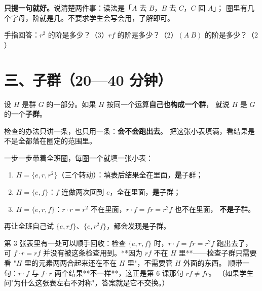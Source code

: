 \begin{zhu}
  \textbf{只提一句就好。}说清楚两件事：读法是「\(A\) 去 \(B\)，\(B\) 去 \(C\)，\(C\) 回 \(A\)」；
  圈里有几个字母，阶就是几。不要求学生会写会用，了解即可。
\end{zhu}

\begin{caozuo}
  手指回答：\(r^2\) 的阶是多少？（\(3\)）\(rf\) 的阶是多少？（\(2\)）\((A\ B)\) 的阶是多少？（\(2\)）
\end{caozuo}

\section*{三、子群（20—40 分钟）}

\begin{definition}[子群]
  设 \(H\) 是群 \(G\) 的一部分。如果 \(H\) 按同一个运算\textbf{自己也构成一个群}，
  就说 \(H\) 是 \(G\) 的一个\textbf{子群}。
\end{definition}

\begin{zhu}
  检查的办法只讲一条，也只用一条：\textbf{会不会跑出去}。
  把这张小表填满，看结果是不是全都落在圈定的范围里。
\end{zhu}

\begin{caozuo}
  一步一步带着全班圈，每圈一个就填一张小表：
  \begin{enumerate}
    \item \(H=\{e,r,r^2\}\)（三个转动）：填表后结果全在里面，\textbf{是}子群；
    \item \(H=\{e,f\}\)：\(f\) 连做两次回到 \(e\)，全在里面，\textbf{是}子群；
    \item \(H=\{e,r,f\}\)：\(r\cdot r=r^2\) 不在里面，\(r\cdot f=fr=r^2f\) 也不在里面，
      \textbf{不是}子群。
  \end{enumerate}
  再让全班自己试 \(\{e,rf\}\)、\(\{e,r^2f\}\)，都会发现是子群。
\end{caozuo}

\begin{zhu}
  第 3 张表里有一处可以顺手回收：检查 \(\{e,r,f\}\) 时，\(r\cdot f=fr=r^2f\) 跑出去了，
  可 \(f\cdot r=rf\) 并没有被这条检查用到。**因为 \(rf\) 不在 \(H\) 里**——检查子群只需要看
  "\(H\) 里的元素两两合起来还在不在 \(H\) 里"，不需要管 \(H\) 外面的东西。
  顺带一句：\(r\cdot f\) 与 \(f\cdot r\) 两个结果**不一样**，这正是第 6 课那句 \(rf\neq fr\)。
  （如果学生问"为什么这张表左右不对称"，答案就是它不交换。）
\end{zhu}


